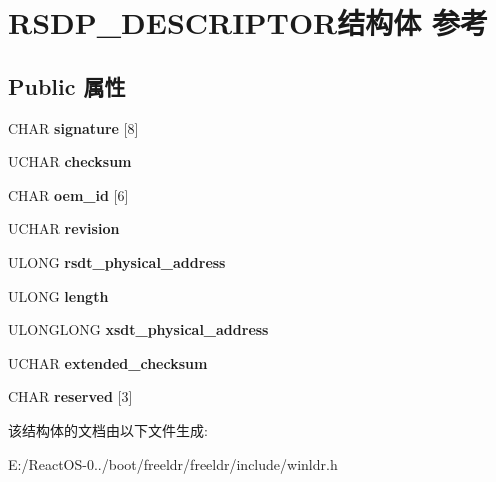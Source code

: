 \hypertarget{struct_r_s_d_p___d_e_s_c_r_i_p_t_o_r}{}\section{R\+S\+D\+P\+\_\+\+D\+E\+S\+C\+R\+I\+P\+T\+O\+R结构体 参考}
\label{struct_r_s_d_p___d_e_s_c_r_i_p_t_o_r}
\subsection*{Public 属性}
\begin{DoxyCompactItemize}
\item 
\mbox{\label{struct_r_s_d_p___d_e_s_c_r_i_p_t_o_r_aae1141d7700368d454b7922dcd22f0db}} 
C\+H\+AR {\bfseries signature} \mbox{[}8\mbox{]}
\item 
\mbox{\label{struct_r_s_d_p___d_e_s_c_r_i_p_t_o_r_a44917313cccf5279d4ce6503c82c59f2}} 
U\+C\+H\+AR {\bfseries checksum}
\item 
\mbox{\label{struct_r_s_d_p___d_e_s_c_r_i_p_t_o_r_a63569abd6c7eb04797738de187f8ccc3}} 
C\+H\+AR {\bfseries oem\+\_\+id} \mbox{[}6\mbox{]}
\item 
\mbox{\label{struct_r_s_d_p___d_e_s_c_r_i_p_t_o_r_ab55d24abce6fbb92fa929059dd7edd77}} 
U\+C\+H\+AR {\bfseries revision}
\item 
\mbox{\label{struct_r_s_d_p___d_e_s_c_r_i_p_t_o_r_a66b1b0691441d4aefc8bdca6b73b7f6b}} 
U\+L\+O\+NG {\bfseries rsdt\+\_\+physical\+\_\+address}
\item 
\mbox{\label{struct_r_s_d_p___d_e_s_c_r_i_p_t_o_r_a0cfd530e443715e9f1c07ebd2f06a39d}} 
U\+L\+O\+NG {\bfseries length}
\item 
\mbox{\label{struct_r_s_d_p___d_e_s_c_r_i_p_t_o_r_af2dfa09a673f60fbab14d7c0feddfd98}} 
U\+L\+O\+N\+G\+L\+O\+NG {\bfseries xsdt\+\_\+physical\+\_\+address}
\item 
\mbox{\label{struct_r_s_d_p___d_e_s_c_r_i_p_t_o_r_a34b36d85e15b05de3d20de375c4899c5}} 
U\+C\+H\+AR {\bfseries extended\+\_\+checksum}
\item 
\mbox{\label{struct_r_s_d_p___d_e_s_c_r_i_p_t_o_r_a7109f435c9060fa53e436dd3a22fc725}} 
C\+H\+AR {\bfseries reserved} \mbox{[}3\mbox{]}
\end{DoxyCompactItemize}


该结构体的文档由以下文件生成\+:\begin{DoxyCompactItemize}
\item 
E\+:/\+React\+O\+S-\/0../boot/freeldr/freeldr/include/winldr.\+h\end{DoxyCompactItemize}
